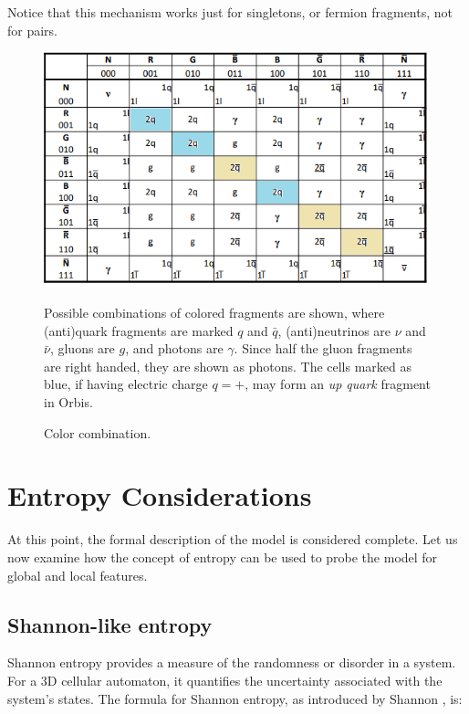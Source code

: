 \documentclass[12pt,english]{article}
\begin{document}
Notice that this mechanism works just for singletons, or fermion fragments, not for pairs.

\begin{figure}
\caption{Color combination.\label{fig:color-combination}}
\medskip{}

\begin{centering}
\includegraphics{fig4}
\par\end{centering}
\medskip{}

{\small{}Possible combinations of colored fragments are shown, where (anti)quark fragments are marked $q$ and $\bar{q}$, (anti)neutrinos are $\nu$ and $\bar{\nu}$, gluons are $g$, and photons are $\gamma$. Since half the gluon fragments are right handed, they are shown as photons. The cells marked as blue, if having electric charge $q=+$, may form an }\emph{\small{}up quark}{\small{} fragment in Orbis.}{\small\par}
\end{figure}

\section{Entropy Considerations\label{sec:Entropy-considerations}}
At this point, the formal description of the model is considered complete. Let us now examine how the concept of entropy can be used to probe the model for global and local features.

\subsection{Shannon-like entropy}
Shannon entropy provides a measure of the randomness or disorder in a system. For a 3D cellular automaton, it quantifies the uncertainty associated with the system's states. The formula for Shannon entropy, as introduced by Shannon \cite{shannon}, is:
\end{document}

